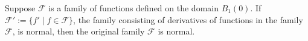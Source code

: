 \documentclass{homework}
\begin{document}
                                                                                                                                                      \begin{problem}\label{derivatives-normal-then-not-normal}Suppose $\mathcal{F}$ is a family of functions defined on the domain $B_1(0)$.  If $\mathcal{F}' := \{ f' \mid f \in \mathcal{F} \}$, the
                                                                                                                                                        family consisting of derivatives of functions in the family
                                                                                                                                                          $\mathcal{F}$, is normal, then the original family $\mathcal{F}$ is
                                                                                                                                                            normal. %
                                                                                                                                                            \end{problem}
\end{document}
